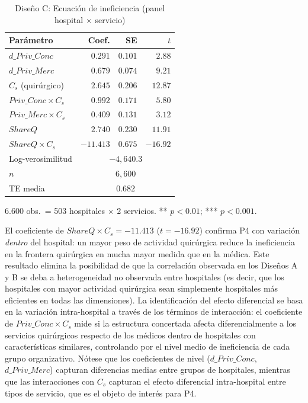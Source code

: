 \begin{table}[htbp]
\centering
\caption{Diseño C: Ecuación de ineficiencia (panel hospital $\times$ servicio)}
\label{tab:disC}
\begin{threeparttable}
\begin{tabular}{lrrr}
\toprule
\textbf{Parámetro} & \textbf{Coef.} & \textbf{SE} & \textbf{$t$} \\
\midrule
$d\_Priv\_Conc$ & $0.291$ & $0.101$ & $2.88$\sig{**} \\
$d\_Priv\_Merc$ & $0.679$ & $0.074$ & $9.21$\sig{***} \\
$C_s$ (quirúrgico) & $2.645$ & $0.206$ & $12.87$\sig{***} \\
$Priv\_Conc \times C_s$ & $0.992$ & $0.171$ & $5.80$\sig{***} \\
$Priv\_Merc \times C_s$ & $0.409$ & $0.131$ & $3.12$\sig{**} \\
$ShareQ$ & $2.740$ & $0.230$ & $11.91$\sig{***} \\
$ShareQ \times C_s$ & $-11.413$ & $0.675$ & $-16.92$\sig{***} \\
\midrule
Log-verosimilitud & \multicolumn{3}{c}{$-4{,}640.3$} \\
$n$ & \multicolumn{3}{c}{$6{,}600$} \\
TE media & \multicolumn{3}{c}{$0.682$} \\
\bottomrule
\end{tabular}
\begin{tablenotes}
  \small
  \item 6.600 obs.\ = 503 hospitales $\times$ 2 servicios. ** $p<0.01$; *** $p<0.001$.
\end{tablenotes}
\end{threeparttable}
\end{table}

El coeficiente de $ShareQ \times C_s = -11.413$ ($t=-16.92$) confirma P4 con variación \textit{dentro} del hospital: un mayor peso de actividad quirúrgica reduce la ineficiencia en la frontera quirúrgica en mucha mayor medida que en la médica. Este resultado elimina la posibilidad de que la correlación observada en los Diseños A y B se deba a heterogeneidad no observada entre hospitales (es decir, que los hospitales con mayor actividad quirúrgica sean simplemente hospitales más eficientes en todas las dimensiones). La identificación del efecto diferencial se basa en la variación intra-hospital a través de los términos de interacción: el coeficiente de $Priv\_Conc \times C_s$ mide si la estructura concertada afecta diferencialmente a los servicios quirúrgicos respecto de los médicos dentro de hospitales con características similares, controlando por el nivel medio de ineficiencia de cada grupo organizativo. Nótese que los coeficientes de nivel ($d\_Priv\_Conc$, $d\_Priv\_Merc$) capturan diferencias medias entre grupos de hospitales, mientras que las interacciones con $C_s$ capturan el efecto diferencial intra-hospital entre tipos de servicio, que es el objeto de interés para P4.

